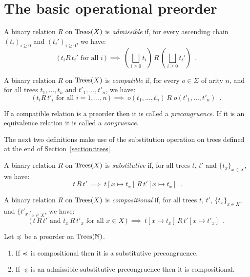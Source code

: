 \section{The basic operational preorder}




\begin{definition}[Admissibility]
    A binary relation $R$ on $\textnormal{Trees}(X)$ is \emph{admissible} if,
    for every ascending chain $(t_i)_{i \geq 0}$ and 
    $(t_i')_{i\geq 0}$, we have:
    \[ \text{($\,t_i  R \, t_i'$ for all $i\,$)} ~ \implies~
        \left(\bigsqcup_{i \geq 0} t_i\right) \, R \, \left(\bigsqcup_{i \geq 0} t_i'\right) \enspace .
    \]
\end{definition}

\begin{definition}[Compatibility]
    A binary relation $R$ on $\textnormal{Trees}(X)$ is  \emph{compatible} if,
    for every $o \in \Sigma$ of arity $n$, and for all trees 
     $t_1,\dots, t_n$ and $t'_1, \dots, t'_n$, we have:
    \[ \text{($\,t_i  R \, t'_i$ for all $i = 1, \dots, n\,$)} ~ \implies ~ 
        o(t_1, \dots, t_n) \, R \; o(t'_1, \dots, t'_n) \enspace .
    \]
\end{definition}
If a compatible relation is a preorder then it is called a \emph{precongruence}. If it is an equivalence relation it is called a \emph{congruence}.

\noindent
The next two definitions make use of the substitution operation on trees defined at the end of
Section~\ref{section:trees}.
\begin{definition}[Substitutive]
    A binary relation $R$ on $\textnormal{Trees}(X)$ is  \emph{substitutive} if,
    for all trees $t$, $t'$ and $\{t_x\}_{x \in X}$, we have:
    \[ \text{$\,t\, R \, t'$} ~ \implies ~ 
       t[ x \mapsto t_x] \, R \, t'[ x \mapsto t_x] \enspace .
    \]
\end{definition}



\begin{definition}[Compositionality]
    A binary relation $R$ on $\textnormal{Trees}(X)$ is \emph{compositional} if, for all 
    trees $t$, $t'$,  $\{t_x\}_{x \in X}$,  and $\{t'_x\}_{x \in X}$, we have:
        \[ \text{($\,t \, R \, t'$ and $t_x \, R \, t'_x$ for all $x \in X\,$)} ~ \implies ~ 
        t[ x \mapsto t_x] \, R \, t'[ x \mapsto t'_x] \enspace .
    \]
\end{definition}



\begin{proposition} Let $\preccurlyeq$ be a preorder  on $\textnormal{Trees}(\mathbb{N})$.
\begin{enumerate} 
\item If  $\preccurlyeq$ is compositional then it is a substitutive precongruence.
\item If $\preccurlyeq$ is an admissible substitutive precongruence then it is compositional.
\end{enumerate}
\end{proposition}

